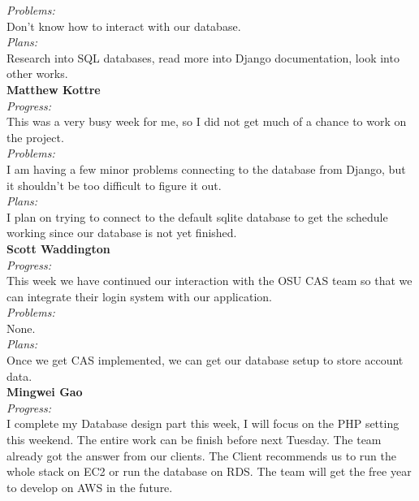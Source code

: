 \noindent\textit{Problems:}\\
\noindent Don't know how to interact with our database.\\

\noindent\textit{Plans:}\\
\noindent Research into SQL databases, read more into Django documentation, look into other works.\\

\noindent\textbf{Matthew Kottre}\\
\noindent\textit{Progress:}\\
This was a very busy week for me, so I did not get much of a chance to work on the project.\\

\noindent\textit{Problems:}\\
\noindent I am having a few minor problems connecting to the database from Django, but it shouldn't be too difficult to figure it out.\\

\noindent\textit{Plans:}\\
\noindent I plan on trying to connect to the default sqlite database to get the schedule working since our database is not yet finished.\\

\noindent\textbf{Scott Waddington}\\
\noindent\textit{Progress:}\\
This week we have continued our interaction with the OSU CAS team so that we can integrate their login system with our application.\\

\noindent\textit{Problems:}\\
\noindent None.\\

\noindent\textit{Plans:}\\
\noindent Once we get CAS implemented, we can get our database setup to store account data.\\

\noindent\textbf{Mingwei Gao}\\
\noindent\textit{Progress:}\\
 I complete my Database design part this week, I will focus on the PHP setting this weekend. The entire work can be finish before next Tuesday. The team already got the answer from our clients. The Client recommends us to run the whole stack on EC2 or run the database on RDS. The team will get the free year to develop on AWS in the future. \\

